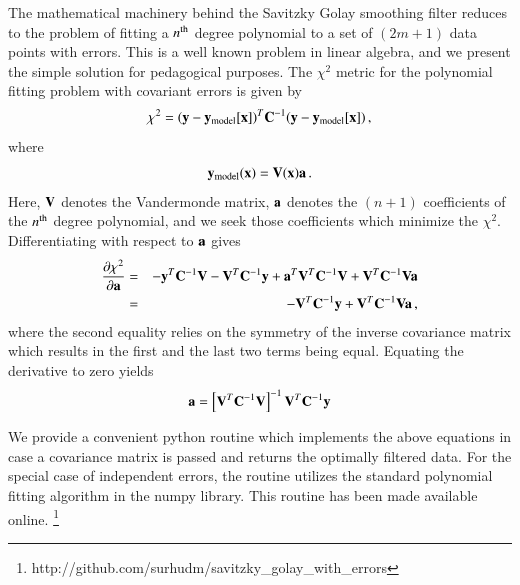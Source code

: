 \documentclass[iop, apj, onecolumn]{emulateapj}
\begin{document}
The mathematical machinery behind the Savitzky Golay smoothing filter reduces to
the problem of fitting a $n^{\rm th}$ degree polynomial to a set of $(2m+1)$
data points with errors. This is a well known problem in linear algebra, and we
present the simple solution for pedagogical purposes. The $\chi^2$ metric for
the polynomial fitting problem with covariant errors is given by
\begin{equation}
        \chi^2 = ({\bf y}-{\bf y}_{\rm model}[{\bf x}])^T {\bf C}^{-1}
                ({\bf y}-{\bf y}_{\rm model}[{\bf x}])\,,
\end{equation}
where
\begin{equation} 
        {\bf y}_{\rm model}({\bf x}) = {\bf V}({\bf x}){\bf a}\,.
\end{equation}
Here, ${\bf V}$ denotes the Vandermonde matrix, ${\bf a}$ denotes the $(n+1)$
coefficients of the $n^{\rm th}$ degree polynomial, and we seek those
coefficients which minimize the $\chi^2$. Differentiating with respect to ${\bf
a}$ gives
\begin{eqnarray}
        \frac{\partial \chi^2}{\partial {\bf a}} &=& -{\bf y}^T {\bf C}^{-1} {\bf
        V} - {\bf V}^T {\bf C}^{-1} {\bf y} + {\bf a}^T {\bf
        V}^T {\bf C}^{-1} {\bf V} + {\bf V}^T {\bf C}^{-1} {\bf V} {\bf a} \\
        &=& - {\bf V}^T {\bf C}^{-1} {\bf y} + {\bf V}^T {\bf C}^{-1} {\bf V}
        {\bf a}\,,
\end{eqnarray}
where the second equality relies on the symmetry of the inverse covariance
matrix which results in the first and the last two terms being equal. Equating
the derivative to zero yields
\begin{equation}
        {\bf a} = \left[ {\bf V}^T {\bf C}^{-1} {\bf V}\right]^{-1} {\bf
        V}^T{\bf C}^{-1} {\bf y}
\end{equation}

We provide a convenient python routine which implements the above equations in
case a covariance matrix is passed and returns the optimally filtered data.  For
the special case of independent errors, the routine utilizes the standard
polynomial fitting algorithm in the numpy library. This routine has been made available online.
\footnote{http://github.com/surhudm/savitzky\_golay\_with\_errors}
\end{document}
